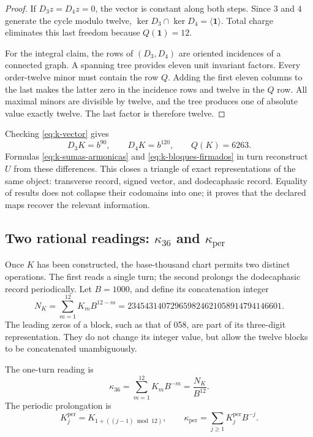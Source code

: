 \begin{proof}
If \(D_3z=D_4z=0\), the vector is constant along both steps.
Since \(3\) and \(4\) generate the cycle modulo twelve,
\(\ker D_3\cap\ker D_4=\langle\mathbf1\rangle\). Total charge
eliminates this last freedom because \(Q(\mathbf1)=12\).

For the integral claim, the rows of \((D_3,D_4)\) are oriented
incidences of a connected graph. A spanning tree provides eleven
unit invariant factors. Every order-twelve minor must contain the
row \(Q\). Adding the first eleven columns to the last makes the latter
zero in the incidence rows and twelve in the \(Q\) row. All
maximal minors are divisible by twelve, and the tree produces one of
absolute value exactly twelve. The last factor is therefore twelve.
\end{proof}

Checking \eqref{eq:k-vector} gives
\[
 D_3K=b^{90},\qquad D_4K=b^{120},\qquad Q(K)=6263.
\]
Formulas \eqref{eq:k-sumas-armonicas} and
\eqref{eq:k-bloques-firmados} in turn reconstruct \(U\) from these
differences. This closes a triangle of exact representations of the
same object: transverse record, signed vector, and dodecaphasic record. Equality
of results does not collapse their codomains into one; it proves that
the declared maps recover the relevant information.



\subsection{Two rational readings: \texorpdfstring{\(\kappa_{36}\)}{kappa36} and \texorpdfstring{\(\kappa_{\mathrm{per}}\)}{periodic kappa}}
\label{subsec:k-kappas}

Once \(K\) has been constructed, the base-thousand chart permits two
distinct operations. The first reads a single turn; the second prolongs the dodecaphasic record
periodically. Let \(B=1000\), and define its concatenation integer
\begin{equation}
 N_K=\sum_{m=1}^{12}K_mB^{12-m}
 =234543140729659824621058914794146601.
 \label{eq:k-numerador}
\end{equation}
The leading zeros of a block, such as that of 058, are part of its
three-digit representation. They do not change its integer value, but allow
the twelve blocks to be concatenated unambiguously.

\begin{definition}
\label{def:k-kappas}
The one-turn reading is
\[
 \kappa_{36}=\sum_{m=1}^{12}K_mB^{-m}=\frac{N_K}{B^{12}}.
\]
The periodic prolongation is
\[
 K_j^{\mathrm{per}}=K_{1+((j-1)\bmod12)},\qquad
 \kappa_{\mathrm{per}}=\sum_{j\geq1}K_j^{\mathrm{per}}B^{-j}.
\]
\end{definition}

